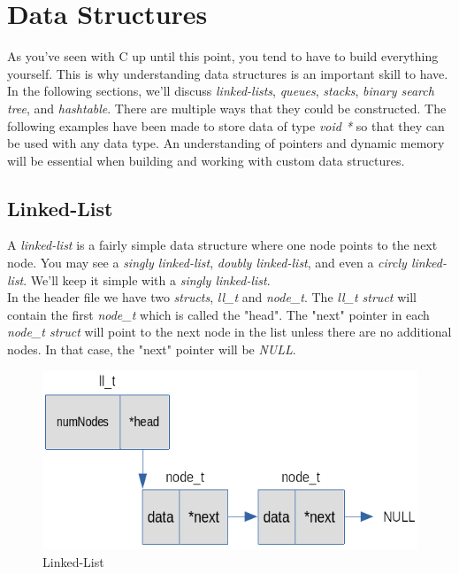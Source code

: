 \documentclass[../main.tex]{subfiles}
\begin{document}
	\chapter{Data Structures}
	As you've seen with C up until this point, you tend to have to build everything yourself.  This is why understanding data structures is an important skill to have.  In the following sections, we'll discuss \textit{linked-lists}, \textit{queues}, \textit{stacks}, \textit{binary search tree}, and \textit{hashtable}.  There are multiple ways that they could be constructed.  The following examples have been made to store data of type \textit{void *} so that they can be used with any data type.  An understanding of pointers and dynamic memory will be essential when building and working with custom data structures.
	
	\section{Linked-List}
	A \textit{linked-list} is a fairly simple data structure where one node points to the next node.  You may see a \textit{singly linked-list}, \textit{doubly linked-list}, and even a \textit{circly linked-list}.  We'll keep it simple with a \textit{singly linked-list}.\\
	
	
	In the header file we have two \textit{structs}, \textit{ll\_t} and \textit{node\_t}.  The \textit{ll\_t struct} will contain the first \textit{node\_t} which is called the "head".  The "next" pointer in each \textit{node\_t struct} will point to the next node in the list unless there are no additional nodes.  In that case, the "next" pointer will be \textit{NULL}.
	
	\begin{figure}[h]
		\centering\includegraphics[scale=0.5]{linkedlist.png}
		\caption{Linked-List}
		\label{fig:linked_list}
	\end{figure}
\end{document}
